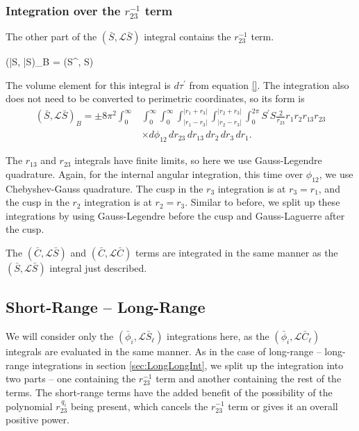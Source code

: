 \documentclass[Dissertation.tex]{subfiles}
\begin{document}
\subsubsection{Integration over the \texorpdfstring{$r_{23}^{-1}$} {1/r23} term}
\label{sec:LongLongR23}
The other part of the $(\bar{S},\mathcal{L} \bar{S})$ integral contains the $r_{23}^{-1}$ term.

\beq
(\bar{S}, \bar{S})_B = \pm \left(S^\prime,  S\right)
\eeq


\noindent The volume element for this integral is $d\tau^\prime$ from equation \ref{}.  The integration also does not need to be converted to perimetric coordinates, so its form is
\begin{align}
(\bar{S},\mathcal{L} \bar{S})_B = \pm 8\pi^2 \int_0^\infty & \int_0^\infty \int_0^\infty \int_{|r_1 - r_3|}^{|r_1 + r_3|} \int_{|r_2 - r_3|}^{|r_2 + r_3|} \int_0^{2\pi}  S^\prime S \frac{2}{r_{23}} r_1 r_2 r_{13} r_{23} \nonumber \\
& \times d\phi_{12}\, dr_{23}\, dr_{13}\, dr_2\, dr_3\, dr_1.
\end{align}

The $r_{13}$ and $r_{23}$ integrals have finite limits, so here we use Gauss-Legendre quadrature.  Again, for the internal angular integration, this time over $\phi_{12}$, we use Chebyshev-Gauss quadrature.  The cusp in the $r_3$ integration is at $r_3 = r_1$, and the cusp in the $r_2$ integration is at $r_2 = r_3$.  Similar to before, we split up these integrations by using Gauss-Legendre before the cusp and Gauss-Laguerre after the cusp.

The $(\bar{C},\mathcal{L} \bar{S})$ and $(\bar{C},\mathcal{L} \bar{C})$ terms are integrated in the same manner as the $(\bar{S},\mathcal{L} \bar{S})$ integral just described.


\subsection{Short-Range -- Long-Range}
\label{sec:ShortLongInt}
We will consider only the $(\bar{\phi}_i,\mathcal{L} \bar{S}_\ell)$ integrations here, as the $(\bar{\phi}_i,\mathcal{L} \bar{C}_\ell)$ integrals are evaluated in the same manner. As in the case of long-range -- long-range integrations in section \ref{sec:LongLongInt}, we split up the integration into two parts -- one containing the $r_{23}^{-1}$ term and another containing the rest of the terms. The short-range terms have the added benefit of the possibility of the polynomial $r_{23}^{\,q_i}$ being present, which cancels the $r_{23}^{-1}$ term or gives it an overall positive power.
\end{document}

